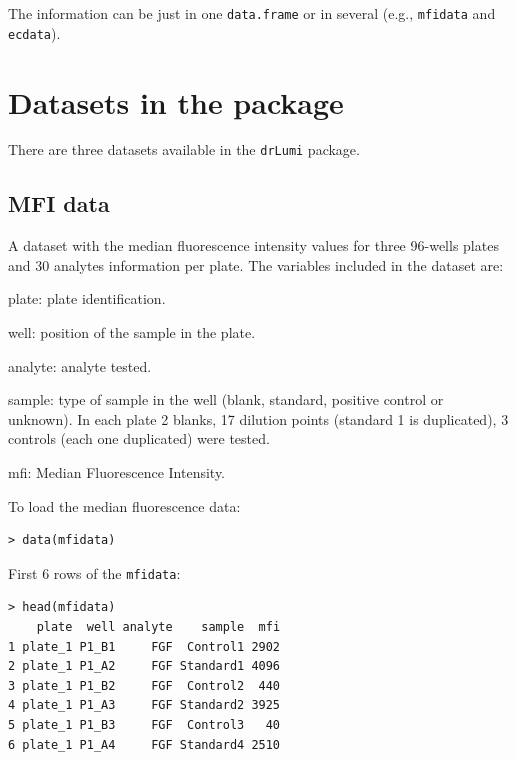 \documentclass[11pt]{article}\usepackage[]{graphicx}\usepackage[]{color}
\makeatletter
\newenvironment{kframe}{%
 \def\at@end@of@kframe{}%
 \ifinner\ifhmode%
  \def\at@end@of@kframe{\end{minipage}}%
  \begin{minipage}{\columnwidth}%
 \fi\fi%
 \def\FrameCommand##1{\hskip\@totalleftmargin \hskip-\fboxsep
 \colorbox{shadecolor}{##1}\hskip-\fboxsep
     \hskip-\linewidth \hskip-\@totalleftmargin \hskip\columnwidth}%
 \MakeFramed {\advance\hsize-\width
   \@totalleftmargin\z@ \linewidth\hsize
   \@setminipage}}%
 {\par\unskip\endMakeFramed%
 \at@end@of@kframe}
\newenvironment{knitrout}{}{} %
\newenvironment{itemize*}%
    {\begin{itemize}%
        \setlength{\itemsep}{-0.35cm}%
        \setlength{\parskip}{10pt}}%
{\end{itemize}}
\makeatother
\begin{document}
\noindent The information can be just in one {\tt data.frame} or 
in several (e.g., {\tt mfidata} and {\tt ecdata}).


\section{Datasets in the package} 

There are three datasets available in the {\tt drLumi} package. 

\subsection{MFI data}
A dataset with the median fluorescence intensity values for three 
96-wells plates and 30 analytes information per plate.  The variables 
included in the dataset are:

\begin{itemize*}
    \item plate: plate identification.
    \item well: position of the sample in the plate.
    \item analyte: analyte tested.
    \item sample: type of sample in the well (blank, standard, positive 
    control or unknown). In each plate 2 blanks,  17 dilution points (standard 
    1 is duplicated), 3 controls (each one duplicated) were tested.
    \item mfi: Median Fluorescence Intensity.
\end{itemize*}

\noindent To load the median fluorescence data:
\begin{knitrout}
\color{fgcolor}\begin{kframe}
\begin{verbatim}
> data(mfidata)
\end{verbatim}
\end{kframe}
\end{knitrout}


\noindent First 6 rows of the {\tt mfidata}:
\begin{knitrout}
\color{fgcolor}\begin{kframe}
\begin{verbatim}
> head(mfidata)
    plate  well analyte    sample  mfi
1 plate_1 P1_B1     FGF  Control1 2902
2 plate_1 P1_A2     FGF Standard1 4096
3 plate_1 P1_B2     FGF  Control2  440
4 plate_1 P1_A3     FGF Standard2 3925
5 plate_1 P1_B3     FGF  Control3   40
6 plate_1 P1_A4     FGF Standard4 2510
\end{verbatim}
\end{kframe}
\end{knitrout}
\end{document}
